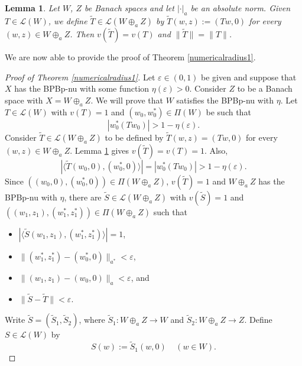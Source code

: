 \documentclass[10pt,a4paper]{amsart}
\theoremstyle{plain}
\newtheorem{lemma}[theorem]{Lemma}
\theoremstyle{definition}
\newcommand{\eps}{\varepsilon}
\begin{document}
\begin{lemma} \label{radius} Let $W$, $Z$ be Banach spaces and let $|\cdot|_a$ be an absolute norm. Given $T \in \mathcal{L}(W)$, we define $\widetilde{T} \in \mathcal{L}(W \oplus_a Z)$ by $\widetilde{T}(w, z) := (Tw, 0)$ for every $(w, z) \in W \oplus_a Z$. Then $v(\widetilde{T}) = v(T)$ and $\|\widetilde{T}\|=\|T\|$.
\end{lemma}

We are now able to provide the proof of Theorem \ref{numericalradius1}.

\begin{proof}[Proof of Theorem \ref{numericalradius1}] Let $\eps \in (0, 1)$ be given and suppose that $X$ has the BPBp-nu with some function $\eta(\eps) > 0$. Consider $Z$ to be a Banach space with $X = W \oplus_a Z$. We will prove that $W$ satisfies the BPBp-nu with $\eta$. Let $T \in \mathcal{L}(W)$ with $v(T) = 1$ and $(w_0, w_0^*) \in \Pi(W)$ be such that
	\begin{equation*}
	|w_0^*(Tw_0)| > 1 - \eta(\eps).
	\end{equation*}
Consider $\widetilde{T} \in \mathcal{L}(W \oplus_a Z)$ to be defined by $\widetilde{T}(w, z) = (Tw, 0)$ for every $(w, z) \in W \oplus_a Z$. Lemma \ref{radius} gives $v(\widetilde{T}) = v(T) = 1$. Also,
\begin{equation*}
|\langle \widetilde{T}(w_0, 0), (w_0^*, 0) \rangle| = |w_0^*(Tw_0)| > 1 - \eta(\eps).
\end{equation*}
Since $((w_0, 0), (w_0^*, 0)) \in \Pi(W \oplus_a Z)$, $v(\widetilde{T}) = 1$ and $W \oplus_a Z$ has the BPBp-nu with $\eta$, there are $\widetilde{S} \in \mathcal{L}(W \oplus_a Z)$ with $v(\widetilde{S}) = 1$ and $((w_1, z_1), (w_1^*, z_1^*)) \in \Pi(W \oplus_a Z)$ such that	
\begin{itemize}
\item[(a)] $|\langle \widetilde{S}(w_1, z_1), (w_1^*, z_1^*) \rangle | = 1$,
\item[(b)] $\|(w_1^*, z_1^*) - (w_0^*, 0)\|_{a^*} < \eps$,
\item[(c)] $\|(w_1, z_1) - (w_0, 0)\|_a < \eps$, and
\item[(d)] $\|\widetilde{S} - \widetilde{T}\| < \eps$.
\end{itemize}
\noindent
Write $\widetilde{S} = (\widetilde{S}_1, \widetilde{S}_2)$, where $\widetilde{S}_1: W \oplus_a Z \longrightarrow W$ and $\widetilde{S}_2: W \oplus_a Z \longrightarrow Z$. Define $S \in \mathcal{L}(W)$ by
\begin{equation*}
S(w) := \widetilde{S}_1(w, 0) \ \ \ \  \ (w \in W).

\end{equation*}
\end{proof}
\end{document}

